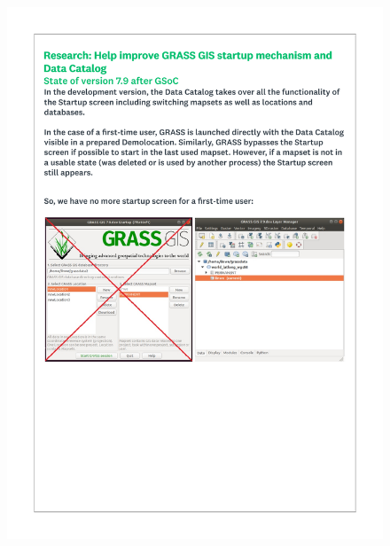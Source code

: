 \documentclass[a4paper,10pt,twoside]{article}
\begin{document}
 \newpage
 \begin{figure}[hbt!]
 \begin{center}
 \includegraphics[width=15.5cm]{../surveys/questionnaires/survey1_part1_page2_intro.pdf}
 \end{center}
 \end{figure}
  
\end{document}
